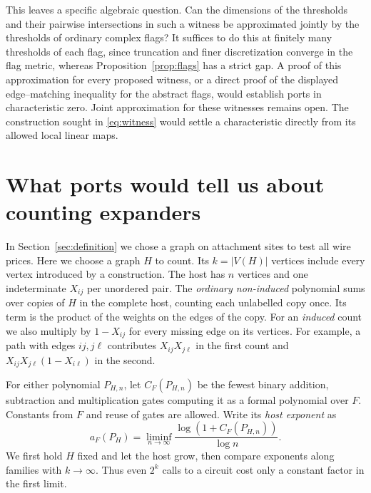 \documentclass[11pt]{article}
\theoremstyle{definition}
\begin{document}
This leaves a specific algebraic question. Can the dimensions of the
thresholds and their pairwise intersections in such a witness be
approximated jointly by the thresholds of ordinary complex flags? It suffices to do
this at finitely many thresholds of each flag, since truncation and finer
discretization converge in the flag metric, whereas
Proposition~\ref{prop:flags} has a strict gap. A proof of this approximation
for every proposed witness, or a direct proof of the displayed
edge--matching inequality for the abstract flags, would establish ports
in characteristic zero. Joint approximation for these witnesses remains
open. The construction sought in \eqref{eq:witness} would settle a
characteristic directly from its allowed local linear maps.

\section{What ports would tell us about counting expanders}
\label{sec:patterns}

In Section~\ref{sec:definition} we chose a graph on attachment sites
to test all wire prices. Here we choose a graph \(H\) to count. Its
\(k=|V(H)|\) vertices include every vertex introduced by a construction.
The host has \(n\) vertices and one indeterminate \(X_{ij}\) per unordered
pair. The \emph{ordinary non-induced} polynomial sums over copies of
\(H\) in the complete host, counting each unlabelled copy once. Its term
is the product of the weights on the edges of the copy. For an
\emph{induced} count we also multiply by \(1-X_{ij}\) for every missing
edge on its vertices. For example, a path with edges \(ij,j\ell\)
contributes \(X_{ij}X_{j\ell}\) in the first count and
\(X_{ij}X_{j\ell}(1-X_{i\ell})\) in the second.

For either polynomial \(P_{H,n}\), let \(C_F(P_{H,n})\) be the fewest
binary addition, subtraction and multiplication gates computing it as a
formal polynomial over \(F\). Constants from \(F\) and reuse of gates are
allowed. Write its \emph{host exponent} as
\[
       a_F(P_H)=\liminf_{n\to\infty}
                      \frac{\log(1+C_F(P_{H,n}))}{\log n}.
\]
We first hold \(H\) fixed and let the host grow, then compare exponents
along families with \(k\to\infty\). Thus even \(2^k\) calls to a circuit
cost only a constant factor in the first limit.
\end{document}
